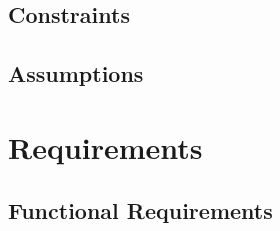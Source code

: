  \section {Constraints}
 \Large
 


  \section {Assumptions}
\Large
  
\chapter{Requirements}
\label{Requirements}

\section{Functional Requirements}
\Large{

}
